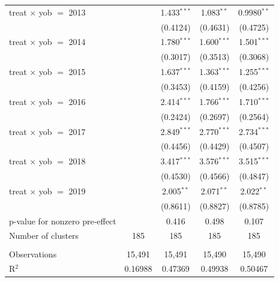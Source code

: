 \begin{table}[htbp]
\begin{tabular}{lcccc}
      treat $\times$ yob $=$ 2013    &               & 1.433$^{***}$ & 1.083$^{**}$  & 0.9980$^{**}$\\   
                                     &               & (0.4124)      & (0.4631)      & (0.4725)\\   
      treat $\times$ yob $=$ 2014    &               & 1.780$^{***}$ & 1.600$^{***}$ & 1.501$^{***}$\\   
                                     &               & (0.3017)      & (0.3513)      & (0.3068)\\   
      treat $\times$ yob $=$ 2015    &               & 1.637$^{***}$ & 1.363$^{***}$ & 1.255$^{***}$\\   
                                     &               & (0.3453)      & (0.4159)      & (0.4256)\\   
      treat $\times$ yob $=$ 2016    &               & 2.414$^{***}$ & 1.766$^{***}$ & 1.710$^{***}$\\   
                                     &               & (0.2424)      & (0.2697)      & (0.2564)\\   
      treat $\times$ yob $=$ 2017    &               & 2.849$^{***}$ & 2.770$^{***}$ & 2.734$^{***}$\\   
                                     &               & (0.4456)      & (0.4429)      & (0.4507)\\   
      treat $\times$ yob $=$ 2018    &               & 3.417$^{***}$ & 3.576$^{***}$ & 3.515$^{***}$\\   
                                     &               & (0.4530)      & (0.4566)      & (0.4847)\\   
      treat $\times$ yob $=$ 2019    &               & 2.005$^{**}$  & 2.071$^{**}$  & 2.022$^{**}$\\   
                                     &               & (0.8611)      & (0.8827)      & (0.8785)\\   
      p-value for nonzero pre-effect &               & 0.416         & 0.498         & 0.107\\  
      Number of clusters             & 185           & 185           & 185           & 185\\  
       \\
      Observations                   & 15,491        & 15,491        & 15,490        & 15,490\\  
      R$^2$                          & 0.16988       & 0.47369       & 0.49938       & 0.50467\\  

\end{tabular}
\end{table}
